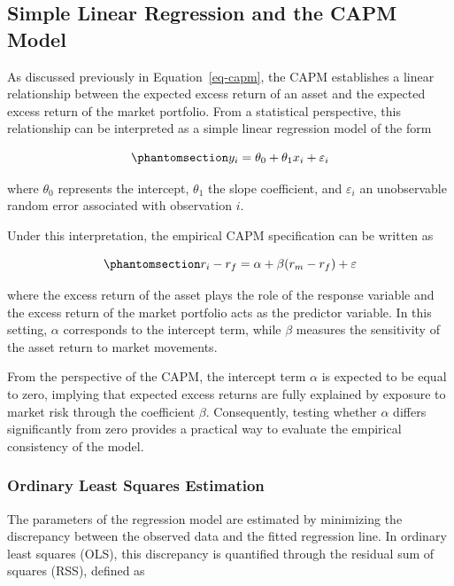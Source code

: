 \documentclass[
  12pt,
  letterpaper,
]{book}
\begin{document}
\subsection{Simple Linear Regression and the CAPM
Model}\label{simple-linear-regression-and-the-capm-model}

As discussed previously in Equation~\ref{eq-capm}, the CAPM establishes
a linear relationship between the expected excess return of an asset and
the expected excess return of the market portfolio. From a statistical
perspective, this relationship can be interpreted as a simple linear
regression model of the form

\begin{equation}\phantomsection\label{eq-slr-model}{
y_i = \theta_0 + \theta_1 x_i + \varepsilon_i
}\end{equation}

where \(\theta_0\) represents the intercept, \(\theta_1\) the slope
coefficient, and \(\varepsilon_i\) an unobservable random error
associated with observation \(i\).

Under this interpretation, the empirical CAPM specification can be
written as

\begin{equation}\phantomsection\label{eq-capm-regression}{
r_i - r_f =
\alpha +
\beta(r_m - r_f)
+
\varepsilon
}\end{equation}

where the excess return of the asset plays the role of the response
variable and the excess return of the market portfolio acts as the
predictor variable. In this setting, \(\alpha\) corresponds to the
intercept term, while \(\beta\) measures the sensitivity of the asset
return to market movements.

From the perspective of the CAPM, the intercept term \(\alpha\) is
expected to be equal to zero, implying that expected excess returns are
fully explained by exposure to market risk through the coefficient
\(\beta\). Consequently, testing whether \(\alpha\) differs
significantly from zero provides a practical way to evaluate the
empirical consistency of the model.

\subsubsection{Ordinary Least Squares
Estimation}\label{ordinary-least-squares-estimation}

The parameters of the regression model are estimated by minimizing the
discrepancy between the observed data and the fitted regression line. In
ordinary least squares (OLS), this discrepancy is quantified through the
residual sum of squares (RSS), defined as
\end{document}
